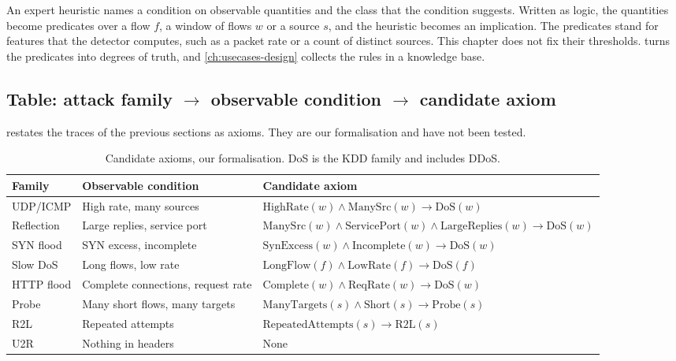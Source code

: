 An expert heuristic names a condition on observable quantities and the class
that the condition suggests. Written as logic, the quantities become
predicates over a flow $f$, a window of flows $w$ or a source $s$, and the
heuristic becomes an implication. The predicates stand for features that the
detector computes, such as a packet rate or a count of distinct sources. This
chapter does not fix their thresholds.  turns the predicates into
degrees of truth, and \cref{ch:usecases-design} collects the rules in a knowledge base.

\subsection{Table: attack family $\rightarrow$ observable condition $\rightarrow$ candidate axiom}
\label{sec:family-condition-axiom}

 restates the traces of the previous sections as
axioms. They are our formalisation and have not been tested.

\begin{table}[htbp]
\centering
\footnotesize
\setlength{\tabcolsep}{3pt}
\caption{Candidate axioms, our formalisation. DoS is the KDD family and
includes DDoS.}
\label{tab:candidate-axioms}
\begin{tabular}{@{}p{1.9cm}p{3.9cm}p{6.5cm}@{}}
\toprule
Family & Observable condition & Candidate axiom \\
\midrule
UDP/ICMP & High rate, many sources
  & $\mathrm{HighRate}(w)\wedge\mathrm{ManySrc}(w)\rightarrow\mathrm{DoS}(w)$ \\
Reflection & Large replies, service port
  & $\mathrm{ManySrc}(w)\wedge\mathrm{ServicePort}(w)\wedge\mathrm{LargeReplies}(w)\rightarrow\mathrm{DoS}(w)$ \\
SYN flood & SYN excess, incomplete
  & $\mathrm{SynExcess}(w)\wedge\mathrm{Incomplete}(w)\rightarrow\mathrm{DoS}(w)$ \\
Slow DoS & Long flows, low rate
  & $\mathrm{LongFlow}(f)\wedge\mathrm{LowRate}(f)\rightarrow\mathrm{DoS}(f)$ \\
HTTP flood & Complete connections, request rate
  & $\mathrm{Complete}(w)\wedge\mathrm{ReqRate}(w)\rightarrow\mathrm{DoS}(w)$ \\
Probe & Many short flows, many targets
  & $\mathrm{ManyTargets}(s)\wedge\mathrm{Short}(s)\rightarrow\mathrm{Probe}(s)$ \\
R2L & Repeated attempts
  & $\mathrm{RepeatedAttempts}(s)\rightarrow\mathrm{R2L}(s)$ \\
U2R & Nothing in headers & None \\
\bottomrule
\end{tabular}
\end{table}

